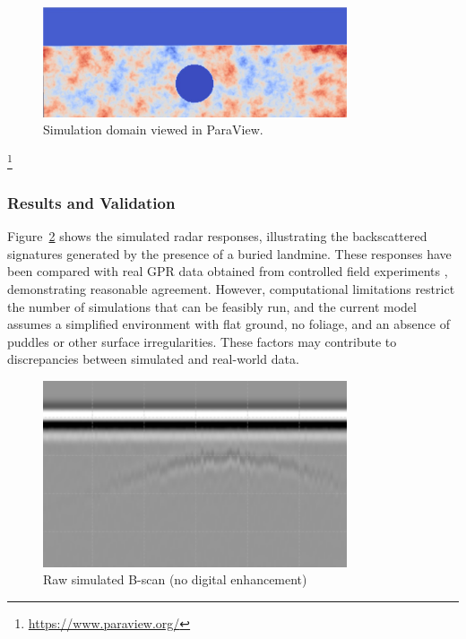         \begin{figure}[htbp]
            \centering
            \includegraphics[width=0.8\textwidth]{figs/Rory/radar_domain.pdf}
            \caption{Simulation domain viewed in ParaView.}
            \label{fig:radar_domain}
        \end{figure}
        \footnote{\url{https://www.paraview.org/}}
    
    \subsubsection{Results and Validation}
    
        Figure~\ref{fig:original_bscan} shows the simulated radar responses, illustrating the backscattered signatures generated by the presence of a buried landmine. These responses have been compared with real GPR data obtained from controlled field experiments \cite{dummyRef7}, demonstrating reasonable agreement. However, computational limitations restrict the number of simulations that can be feasibly run, and the current model assumes a simplified environment with flat ground, no foliage, and an absence of puddles or other surface irregularities. These factors may contribute to discrepancies between simulated and real-world data.
    
        \begin{figure}[htbp]
            \centering
            \includegraphics[width=0.8\textwidth]{figs/Rory/sim_bscan_cropped.png}
            \caption{Raw simulated B-scan (no digital enhancement)}
            \label{fig:original_bscan}
        \end{figure}
    
